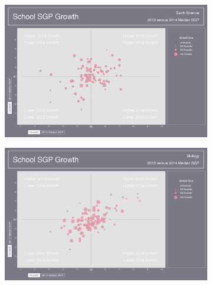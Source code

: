 \documentclass[12pt]{article}
\begin{document}
\begin{figure}[H]
\caption*{\label{fig:Bidensity} {\bf{Fig. C.4:}} Median SGP by Year and Content Area Bubble Plots for End-of-Course Tests (EOCT).}
  \begin{subfigure}[b]{\textwidth}
    \includegraphics[width=\textwidth]{../img/Appendices/Appendix_C/Bubble_Plots/School_2013_2014_EARTH_SCIENCE_Growth.png}
  \end{subfigure}
  \begin{subfigure}[b]{\textwidth}
    \includegraphics[width=\textwidth]{../img/Appendices/Appendix_C/Bubble_Plots/School_2013_2014_BIOLOGY_Growth.png}
  \end{subfigure}
\end{figure}
\end{document}
